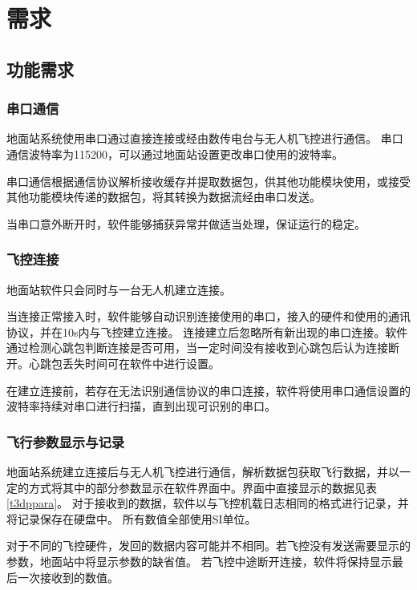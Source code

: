 \section{需求}
\subsection{功能需求}
\label{c31}
\subsubsection{串口通信}
地面站系统使用串口通过直接连接或经由数传电台与无人机飞控进行通信。
串口通信波特率为115200，可以通过地面站设置更改串口使用的波特率。

串口通信根据通信协议解析接收缓存并提取数据包，供其他功能模块使用，或接受其他功能模块传递的数据包，将其转换为数据流经由串口发送。

当串口意外断开时，软件能够捕获异常并做适当处理，保证运行的稳定。

\subsubsection{飞控连接}
地面站软件只会同时与一台无人机建立连接。

当连接正常接入时，软件能够自动识别连接使用的串口，接入的硬件和使用的通讯协议，并在10s内与飞控建立连接。
连接建立后忽略所有新出现的串口连接。软件通过检测心跳包判断连接是否可用，当一定时间没有接收到心跳包后认为连接断开。心跳包丢失时间可在软件中进行设置。

在建立连接前，若存在无法识别通信协议的串口连接，软件将使用串口通信设置的波特率持续对串口进行扫描，直到出现可识别的串口。

\subsubsection{飞行参数显示与记录}
地面站系统建立连接后与无人机飞控进行通信，解析数据包获取飞行数据，并以一定的方式将其中的部分参数显示在软件界面中。界面中直接显示的数据见表\ref{t3dppara}。
对于接收到的数据，软件以与飞控机载日志相同的格式进行记录，并将记录保存在硬盘中。
所有数值全部使用SI单位。

对于不同的飞控硬件，发回的数据内容可能并不相同。若飞控没有发送需要显示的参数，地面站中将显示参数的缺省值。
若飞控中途断开连接，软件将保持显示最后一次接收到的数值。

